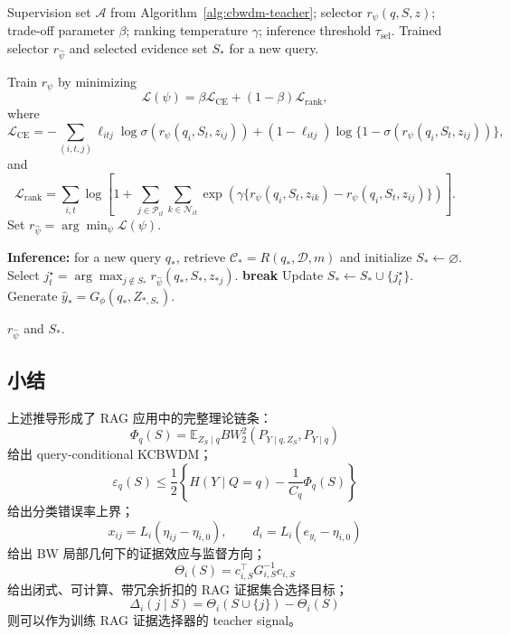 \documentclass[UTF8,a4paper,12pt,oneside]{ctexart}
\numberwithin{equation}{section}
\begin{document}
\begin{algorithm}[t]
\caption{Training and Inference of the RAG-CBWDM Selector}
\label{alg:cbwdm-selector}
\small
\begin{algorithmic}[1]
\REQUIRE Supervision set $\mathcal A$ from Algorithm~\ref{alg:cbwdm-teacher}; selector $r_\psi(q,S,z)$; trade-off parameter $\beta$; ranking temperature $\gamma$; inference threshold $\tau_{\mathrm{sel}}$.
\ENSURE Trained selector $r_{\widehat\psi}$ and selected evidence set $S_\ast$ for a new query.

\STATE Train $r_\psi$ by minimizing
\[
\mathcal L(\psi)
=
\beta\mathcal L_{\mathrm{CE}}
+
(1-\beta)\mathcal L_{\mathrm{rank}},
\]
where
\[
\mathcal L_{\mathrm{CE}}
=
-\sum_{(i,t,j)}
\ell_{itj}\log\sigma(r_\psi(q_i,S_t,z_{ij}))
+
(1-\ell_{itj})\log\{1-\sigma(r_\psi(q_i,S_t,z_{ij}))\},
\]
and
\[
\mathcal L_{\mathrm{rank}}
=
\sum_{i,t}
\log
\left[
1+
\sum_{j\in\mathcal P_{it}}
\sum_{k\in\mathcal N_{it}}
\exp\left(
\gamma\{r_\psi(q_i,S_t,z_{ik})-r_\psi(q_i,S_t,z_{ij})\}
\right)
\right].
\]
\STATE Set $r_{\widehat\psi}=\arg\min_\psi\mathcal L(\psi)$.

\STATE \textbf{Inference:} for a new query $q_\ast$, retrieve $\mathcal C_\ast=R(q_\ast,\mathcal D,m)$ and initialize $S_\ast\leftarrow\varnothing$.
    \STATE Select $j_t^\star=\arg\max_{j\notin S_\ast}r_{\widehat\psi}(q_\ast,S_\ast,z_{\ast j})$.
        \STATE \textbf{break}
    \ENDIF
    \STATE Update $S_\ast\leftarrow S_\ast\cup\{j_t^\star\}$.
\ENDFOR
\STATE Generate $\widehat y_\ast=G_\phi(q_\ast,Z_{\ast,S_\ast})$.

\RETURN $r_{\widehat\psi}$ and $S_\ast$.
\end{algorithmic}
\end{algorithm}

\subsection{小结}

上述推导形成了 RAG 应用中的完整理论链条：
\[
    \Phi_q(S)
    =
    \mathbb E_{Z_S\mid q}
    BW_2^2
    \left(
        P_{Y\mid q,Z_S},
        P_{Y\mid q}
    \right)
\]
给出 query-conditional KCBWDM；
\[
    \varepsilon_q(S)
    \le
    \frac{1}{2}
    \left\{
        H(Y\mid Q=q)
        -
        \frac{1}{C_q}
        \Phi_q(S)
    \right\}
\]
给出分类错误率上界；
\[
    x_{ij}
    =
    L_i(\eta_{ij}-\eta_{i,0}),
    \qquad
    d_i
    =
    L_i(e_{y_i}-\eta_{i,0})
\]
给出 BW 局部几何下的证据效应与监督方向；
\[
    \Theta_i(S)
    =
    c_{i,S}^{\top}
    G_{i,S}^{-1}
    c_{i,S}
\]
给出闭式、可计算、带冗余折扣的 RAG 证据集合选择目标；
\[
    \Delta_i(j\mid S)
    =
    \Theta_i(S\cup\{j\})
    -
    \Theta_i(S)
\]
则可以作为训练 RAG 证据选择器的 teacher signal。
\end{document}
